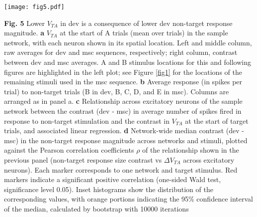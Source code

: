 \documentclass[pdflatex,referee,iicol,sn-basic]{sn-jnl}
\theoremstyle{thmstyleone}%
\theoremstyle{thmstyletwo}%
\theoremstyle{thmstylethree}%
\begin{document}
\begin{figure*}%
    \centering
    \texttt{[image: fig5.pdf]}
    \caption{}
    \label{fig5}
\end{figure*}
\textbf{Fig. 5} Lower $V_{TA}$ in dev is a consequence of lower dev non-target response magnitude.
\textbf{a} $V_{TA}$ at the start of A trials (mean over trials) in the sample network, with each neuron shown in its spatial location. Left and middle column, raw averages for dev and msc sequences, respectively; right column, contrast between dev and msc averages. A and B stimulus locations for this and following figures are highlighted in the left plot; see Figure \ref{fig1} for the locations of the remaining stimuli used in the msc sequence.
\textbf{b} Average response (in spikes per trial) to non-target trials (B in dev, B, C, D, and E in msc). Columns are arranged as in panel a.
\textbf{c} Relationship across excitatory neurons of the sample network between the contrast (dev - msc) in average number of spikes fired in response to non-target stimulation and the contrast in $V_{TA}$ at the start of target trials, and associated linear regression.
\textbf{d} Network-wide median contrast (dev - msc) in the non-target response magnitude across networks and stimuli, plotted against the Pearson correlation coefficients $\rho$ of the relationship shown in the previous panel (non-target response size contrast vs $\Delta V_{TA}$ across excitatory neurons). Each marker corresponds to one network and target stimulus. Red markers indicate a significant positive correlation (one-sided Wald test, significance level 0.05). Inset histograms show the distribution of the corresponding values, with orange portions indicating the 95\% confidence interval of the median, calculated by bootstrap with 10000 iterations
\end{document}
